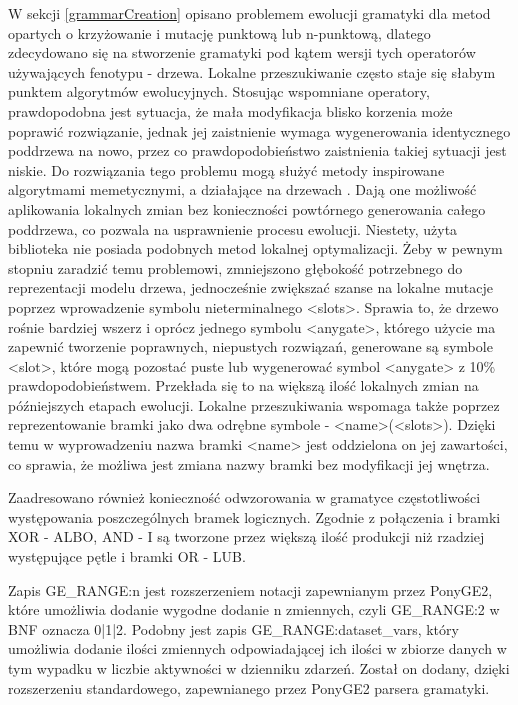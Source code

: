 W sekcji \ref{grammarCreation} opisano problemem ewolucji gramatyki dla metod opartych o krzyżowanie i mutację punktową lub n-punktową, dlatego zdecydowano się na stworzenie gramatyki pod kątem wersji tych operatorów używających fenotypu - drzewa. Lokalne przeszukiwanie często staje się słabym punktem algorytmów ewolucyjnych. Stosując wspomniane operatory, prawdopodobna jest sytuacja, że mała modyfikacja blisko korzenia może poprawić rozwiązanie, jednak jej zaistnienie wymaga wygenerowania identycznego poddrzewa na nowo, przez co prawdopodobieństwo zaistnienia takiej sytuacji jest niskie. Do rozwiązania tego problemu mogą służyć metody inspirowane algorytmami memetycznymi, a działające na drzewach \cite{memetic}. Dają one możliwość aplikowania lokalnych zmian bez konieczności powtórnego generowania całego poddrzewa, co pozwala na usprawnienie procesu ewolucji. Niestety, użyta biblioteka nie posiada podobnych metod lokalnej optymalizacji. Żeby w pewnym stopniu zaradzić temu problemowi, zmniejszono głębokość potrzebnego do reprezentacji modelu drzewa, jednocześnie zwiększać szanse na lokalne mutacje poprzez wprowadzenie symbolu nieterminalnego <slots>. Sprawia to, że drzewo rośnie bardziej wszerz i oprócz jednego symbolu <anygate>, którego użycie ma zapewnić tworzenie poprawnych, niepustych rozwiązań, generowane są symbole <slot>, które mogą pozostać puste lub wygenerować symbol <anygate> z 10\% prawdopodobieństwem. Przekłada się to na większą ilość lokalnych zmian na późniejszych etapach ewolucji. Lokalne przeszukiwania wspomaga także poprzez reprezentowanie bramki jako dwa odrębne symbole - <name>(<slots>). Dzięki temu w wyprowadzeniu nazwa bramki <name> jest oddzielona on jej zawartości, co sprawia, że możliwa jest zmiana nazwy bramki bez modyfikacji jej wnętrza.

Zaadresowano również konieczność odwzorowania w gramatyce częstotliwości występowania poszczególnych bramek logicznych. Zgodnie z \cite{10.1007/978-3-540-69534-9_35} połączenia i bramki XOR - ALBO, AND - I są tworzone przez większą ilość produkcji niż rzadziej występujące pętle i bramki OR - LUB. 

Zapis GE{\_}RANGE:n jest rozszerzeniem notacji zapewnianym przez PonyGE2, które umożliwia dodanie wygodne dodanie n zmiennych, czyli GE{\_}RANGE:2 w BNF oznacza 0|1|2.
Podobny jest zapis GE{\_}RANGE:dataset{\_}vars, który umożliwia dodanie ilości zmiennych odpowiadającej ich ilości w zbiorze danych w tym wypadku w liczbie aktywności w dzienniku zdarzeń. Został on dodany, dzięki rozszerzeniu standardowego, zapewnianego przez PonyGE2 parsera gramatyki.

